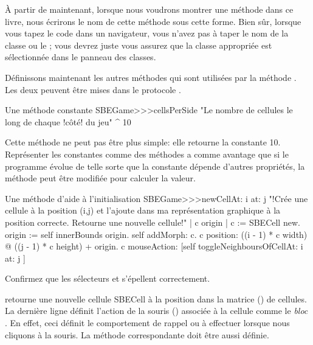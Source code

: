 \documentclass[a4paper,10pt,twoside]{book}
\begin{document}
\`A partir de maintenant, lorsque nous voudrons montrer une méthode dans ce livre, nous écrirons le nom de cette méthode sous cette forme. Bien s\^ur, lorsque vous tapez le code dans un navigateur, vous n'avez pas à taper le nom de la classe ou le \ct{>>>}; vous devrez juste vous assurez que la classe appropriée est sélectionnée dans le panneau des classes.

Définissons maintenant les autres méthodes qui sont utilisées par la méthode . Les deux peuvent être mises dans le protocole .

\begin{method}[sbegamecellsperside]{Une méthode constante}
SBEGame>>>cellsPerSide
   "Le nombre de cellules le long de chaque !c\^ot\'e! du jeu"
   ^ 10
\end{method}

Cette méthode ne peut pas être plus simple: elle retourne la constante
10. Représenter les constantes comme des méthodes a comme avantage que si le programme évolue de telle sorte que la constante dépende d'autres propriétés, la méthode peut être modifiée pour calculer la valeur.

\begin{method}[newCellAt:at:]{Une méthode d'aide à l'initialisation}
SBEGame>>>newCellAt: i at: j
   "!Cr\'ee une cellule \`a la position (i,j) et l'ajoute dans ma repr\'esentation graphique \`a la position correcte. Retourne une nouvelle cellule!"
   | c origin |
   c := SBECell new.
   origin := self innerBounds origin.
   self addMorph: c.
   c position: ((i - 1) * c width) @ ((j - 1) * c height) + origin.
   c mouseAction: [self toggleNeighboursOfCellAt: i at: j ]
\end{method}

Confirmez que les sélecteurs  et  s'épellent correctement.

 retourne une nouvelle cellule SBECell à la position  dans la matrice () de cellules.
La dernière ligne définit l'action de la souris () associée à la cellule comme le \emph{bloc}
\mbox{.}
En effet, ceci définit le comportement de rappel ou \callback à effectuer lorsque nous cliquons \`a la souris.
La méthode correspondante doit être aussi définie.
\end{document}
